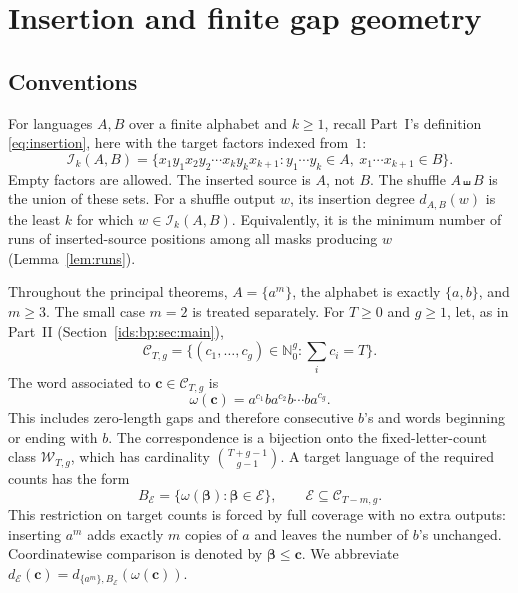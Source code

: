 \documentclass[11pt,letterpaper]{article}
\theoremstyle{definition}\newtheorem{definition}[theorem]{Definition}
\theoremstyle{remark}\newtheorem{remark}[theorem]{Remark}
\theoremstyle{definition}\newtheorem{question}[theorem]{Question}
\newcommand{\Nzero}{\mathbb N_0}
\newcommand{\sh}{\mathbin{\shuffle}}
\newcommand{\ins}[3]{\mathcal I_{#1}(#2,#3)}
\newcommand{\bpgap}[1]{\omega(#1)}
\newcommand{\bpC}[2]{\mathcal C_{#1,#2}}
\newcommand{\bpW}[2]{\mathcal W_{#1,#2}}
\newcommand{\bpE}{\mathcal E}
\begin{document}
\section{Insertion and finite gap geometry}\label{ids:si:sec:geometry}

\subsection{Conventions}
For languages $A,B$ over a finite alphabet and $k\geq1$, recall Part~I's
definition \eqref{eq:insertion}, here with the target factors indexed
from~$1$:
\begin{equation}\label{ids:si:eq:insertion}
 \ins{k}{A}{B}=\{x_1y_1x_2y_2\cdots x_ky_kx_{k+1}:
 y_1\cdots y_k\in A,\ x_1\cdots x_{k+1}\in B\}.
\end{equation}
Empty factors are allowed. The inserted source is $A$, not $B$.
The shuffle $A\sh B$ is the union of these sets. For a shuffle output
$w$, its insertion degree $d_{A,B}(w)$ is the least $k$ for which
$w\in\ins{k}{A}{B}$. Equivalently, it is the minimum number of runs of
inserted-source positions among all masks producing $w$
(Lemma~\ref{lem:runs}).

Throughout the principal theorems, $A=\{a^m\}$, the alphabet is exactly
$\{a,b\}$, and $m\geq3$. The small case $m=2$ is treated separately.
For $T\geq0$ and $g\geq1$, let, as in Part~II
(Section~\ref{ids:bp:sec:main}),
\[
 \bpC{T}{g}=\{(c_1,\ldots,c_g)\in\Nzero^g:\textstyle\sum_i c_i=T\}.
\]
The word associated to $\mathbf c\in\bpC{T}{g}$ is
\begin{equation}\label{ids:si:eq:word}
 \bpgap{\mathbf c}=a^{c_1}ba^{c_2}b\cdots ba^{c_g}.
\end{equation}
This includes zero-length gaps and therefore consecutive $b$'s and words
beginning or ending with $b$. The correspondence is a bijection onto the
fixed-letter-count class
$\bpW{T}{g}$, which has cardinality $\binom{T+g-1}{g-1}$.
A target language of the required counts has the form
\[
 B_{\bpE}=\{\bpgap{\boldsymbol\beta}:\boldsymbol\beta\in \bpE\},\qquad \bpE\subseteq\bpC{T-m}{g}.
\]
This restriction on target counts is forced by full coverage with no extra
outputs: inserting $a^m$ adds exactly $m$ copies of $a$ and leaves the number
of $b$'s unchanged. Coordinatewise comparison is denoted by $\boldsymbol\beta\leq\mathbf c$.
We abbreviate $d_{\bpE}(\mathbf c)=d_{\{a^m\},B_{\bpE}}(\bpgap{\mathbf c})$.
\end{document}
